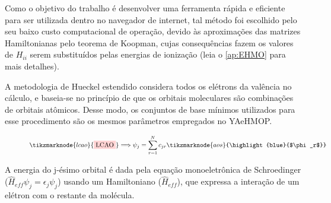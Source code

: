 Como o objetivo do trabalho é desenvolver uma ferramenta rápida e eficiente para ser utilizada dentro no navegador de internet, tal método foi escolhido pelo seu baixo custo computacional de operação, devido às aproximações das matrizes Hamiltonianas pelo teorema de Koopman, cujas consequências fazem os valores de $H_{ii}$ serem substituídos pelas energias de ionização (leia o \autoref{ap:EHMO} para mais detalhes).

A metodologia de Hueckel estendido considera todos os elétrons da valência no cálculo, e baseia-se no princípio de que os orbitais moleculares são combinações de orbitais atômicos. Desse modo, os conjuntos de base mínimos utilizados para esse procedimento são os mesmos parâmetros empregados no \gls{YAeHMOP}\autocite{Avery2017}. 

\begin{figure}[htb]
    \vspace{2\baselineskip}
\begin{equation}
    \label{eq:LCAO}
    \tikzmarknode{lcao}{\highlight{red}{LCAO}} \Longrightarrow \psi_j = \sum_{r=1}^{N} c_{jr} \tikzmarknode{aos}{\highlight{blue}{$\phi_r$}}
\end{equation}
\vspace{2\baselineskip}
\end{figure}

A energia do j-ésimo orbital é dada pela equação monoeletrônica de Schroedinger ($\hat{H}_{eff} \psi_j = \epsilon_j \psi_j$) usando um Hamiltoniano ($\hat{H}_{eff}$), que expressa a interação de um elétron com o restante da molécula.

